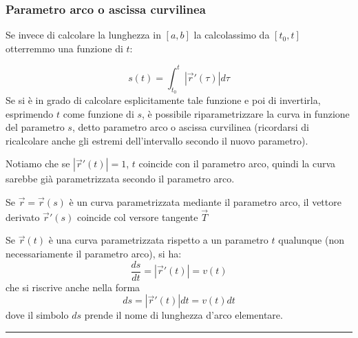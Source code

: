 \subsubsection{Parametro arco o ascissa curvilinea}
Se invece di calcolare la lunghezza in $[a,b]$ la calcolassimo da $[t_0, t]$ otterremmo una funzione di $t$:
\begin{tcolorbox}
\[
    s(t) = \int_{t_0}^{t}|\vec{r}'(\tau)|d\tau
\]
Se si è in grado di calcolare esplicitamente tale funzione e poi di invertirla, esprimendo $t$ come funzione di $s$, è possibile riparametrizzare la curva in funzione del parametro $s$, detto parametro arco o ascissa curvilinea (ricordarsi di ricalcolare anche gli estremi dell'intervallo secondo il nuovo parametro).\newline
\end{tcolorbox}
\begin{tcolorbox}
Notiamo che se $|\vec{r}'(t)| = 1$, $t$ coincide con il parametro arco, quindi la curva sarebbe già parametrizzata secondo  il parametro arco.
\end{tcolorbox}
Se $\vec{r} = \vec{r}(s)$ è un curva parametrizzata mediante il parametro arco, il vettore derivato $\vec{r}'(s)$ coincide col versore tangente $\vec{T}$
\newline
\begin{tcolorbox}
Se $\vec{r}(t)$ è una curva parametrizzata rispetto a un parametro $t$ qualunque (non necessariamente il parametro arco), si ha:
\[
    \frac{ds}{dt} =|\vec{r}'(t)| = v(t)
\]
che si riscrive anche nella forma
\[
    ds =|\vec{r}'(t)|dt =v(t) dt
\] 
dove il simbolo $ds$ prende il nome di lunghezza d'arco elementare.
\end{tcolorbox}
\rule{\textwidth}{2pt}
